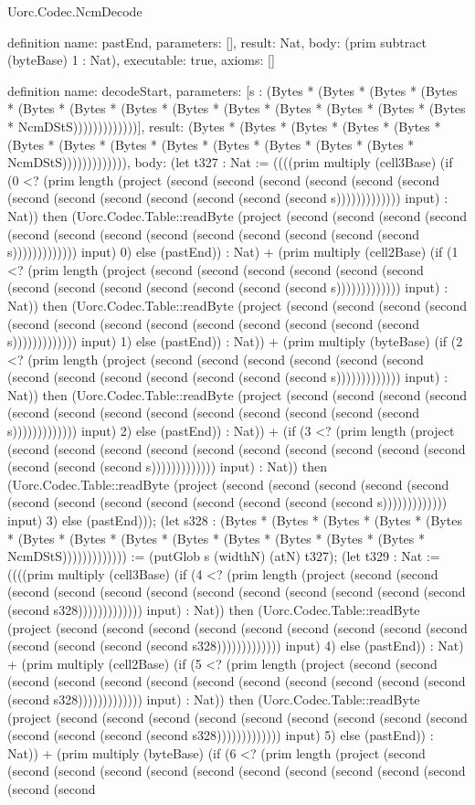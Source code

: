 \begin{lexlean}{Uorc.Codec.NcmDecode}
\begin{semanticmodule}
definition{
  name: pastEnd,
  parameters: [],
  result: Nat,
  body: (prim subtract (byteBase) 1 : Nat),
  executable: true,
  axioms: []
}

definition{
  name: decodeStart,
  parameters: [s : (Bytes * (Bytes * (Bytes * (Bytes * (Bytes * (Bytes * (Bytes * (Bytes * (Bytes * (Bytes * (Bytes * (Bytes * (Bytes * NcmDStS)))))))))))))],
  result: (Bytes * (Bytes * (Bytes * (Bytes * (Bytes * (Bytes * (Bytes * (Bytes * (Bytes * (Bytes * (Bytes * (Bytes * (Bytes * NcmDStS))))))))))))),
  body: (let t327 : Nat := ((((prim multiply (cell3Base) (if (0 <? (prim length (project (second (second (second (second (second (second (second (second (second (second (second (second (second s))))))))))))) input) : Nat)) then (Uorc.Codec.Table::readByte (project (second (second (second (second (second (second (second (second (second (second (second (second (second s))))))))))))) input) 0) else (pastEnd)) : Nat) + (prim multiply (cell2Base) (if (1 <? (prim length (project (second (second (second (second (second (second (second (second (second (second (second (second (second s))))))))))))) input) : Nat)) then (Uorc.Codec.Table::readByte (project (second (second (second (second (second (second (second (second (second (second (second (second (second s))))))))))))) input) 1) else (pastEnd)) : Nat)) + (prim multiply (byteBase) (if (2 <? (prim length (project (second (second (second (second (second (second (second (second (second (second (second (second (second s))))))))))))) input) : Nat)) then (Uorc.Codec.Table::readByte (project (second (second (second (second (second (second (second (second (second (second (second (second (second s))))))))))))) input) 2) else (pastEnd)) : Nat)) + (if (3 <? (prim length (project (second (second (second (second (second (second (second (second (second (second (second (second (second s))))))))))))) input) : Nat)) then (Uorc.Codec.Table::readByte (project (second (second (second (second (second (second (second (second (second (second (second (second (second s))))))))))))) input) 3) else (pastEnd))); (let s328 : (Bytes * (Bytes * (Bytes * (Bytes * (Bytes * (Bytes * (Bytes * (Bytes * (Bytes * (Bytes * (Bytes * (Bytes * (Bytes * NcmDStS))))))))))))) := (putGlob s (widthN) (atN) t327); (let t329 : Nat := ((((prim multiply (cell3Base) (if (4 <? (prim length (project (second (second (second (second (second (second (second (second (second (second (second (second (second s328))))))))))))) input) : Nat)) then (Uorc.Codec.Table::readByte (project (second (second (second (second (second (second (second (second (second (second (second (second (second s328))))))))))))) input) 4) else (pastEnd)) : Nat) + (prim multiply (cell2Base) (if (5 <? (prim length (project (second (second (second (second (second (second (second (second (second (second (second (second (second s328))))))))))))) input) : Nat)) then (Uorc.Codec.Table::readByte (project (second (second (second (second (second (second (second (second (second (second (second (second (second s328))))))))))))) input) 5) else (pastEnd)) : Nat)) + (prim multiply (byteBase) (if (6 <? (prim length (project (second (second (second (second (second (second (second (second (second (second (second (second (second }
\end{semanticmodule}
\end{lexlean}
